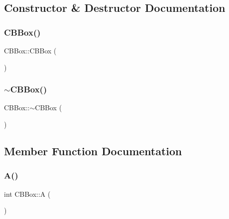 \subsection{Constructor \& Destructor Documentation}
\mbox{\label{classCBBox_af10fa7fdae936cedadfdb8024a3ea9ec}} 
\subsubsection{\texorpdfstring{CBBox()}{CBBox()}}
{\footnotesize\ttfamily C\+B\+Box\+::\+C\+B\+Box (\begin{DoxyParamCaption}{ }\end{DoxyParamCaption})}

\mbox{\label{classCBBox_a5c0f90935c24137442e517a96fb6086e}} 
\subsubsection{\texorpdfstring{$\sim$CBBox()}{~CBBox()}}
{\footnotesize\ttfamily C\+B\+Box\+::$\sim$\+C\+B\+Box (\begin{DoxyParamCaption}{ }\end{DoxyParamCaption})\hspace{0.3cm}{\ttfamily [virtual]}}



\subsection{Member Function Documentation}
\mbox{\label{classCBBox_ae53a02f449d2af63fe2fbf20c77df560}} 
\subsubsection{\texorpdfstring{A()}{A()}}
{\footnotesize\ttfamily int C\+B\+Box\+::A (\begin{DoxyParamCaption}{ }\end{DoxyParamCaption})\hspace{0.3cm}{\ttfamily [inline]}}

\mbox{\label{classCBBox_a270d6116bfea826678ad54c2ab256a6c}} 
